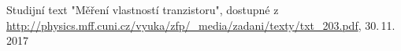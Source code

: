 \documentclass[0-protokol.tex]{subfiles}
\begin{document}
\begin{thebibliography}{}

Studijní text "Měření vlastností tranzistoru", dostupné z\\ \url{http://physics.mff.cuni.cz/vyuka/zfp/_media/zadani/texty/txt_203.pdf}, 30.\,11.\,2017

\end{thebibliography}
\end{document}
